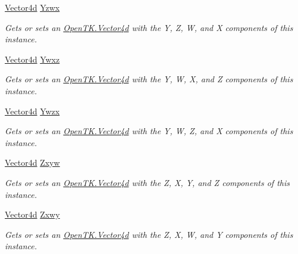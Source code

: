 \begin{DoxyCompactItemize}
\hyperlink{struct_open_t_k_1_1_vector4d}{Vector4d} \hyperlink{struct_open_t_k_1_1_vector4d_a89b53c3e716f7ff0897fd5b7d7e0d424}{Yzwx}
\begin{DoxyCompactList}\small\item\em Gets or sets an \hyperlink{struct_open_t_k_1_1_vector4d}{Open\-T\-K.\-Vector4d} with the Y, Z, W, and X components of this instance. \end{DoxyCompactList}\item 
\hyperlink{struct_open_t_k_1_1_vector4d}{Vector4d} \hyperlink{struct_open_t_k_1_1_vector4d_af6740e2c7d8371dc35017cbdd02cda33}{Ywxz}
\begin{DoxyCompactList}\small\item\em Gets or sets an \hyperlink{struct_open_t_k_1_1_vector4d}{Open\-T\-K.\-Vector4d} with the Y, W, X, and Z components of this instance. \end{DoxyCompactList}\item 
\hyperlink{struct_open_t_k_1_1_vector4d}{Vector4d} \hyperlink{struct_open_t_k_1_1_vector4d_a5af0e53a635f02c740144194401b55e8}{Ywzx}
\begin{DoxyCompactList}\small\item\em Gets or sets an \hyperlink{struct_open_t_k_1_1_vector4d}{Open\-T\-K.\-Vector4d} with the Y, W, Z, and X components of this instance. \end{DoxyCompactList}\item 
\hyperlink{struct_open_t_k_1_1_vector4d}{Vector4d} \hyperlink{struct_open_t_k_1_1_vector4d_a2380266e1d9836e3a31f5e04a33f78f5}{Zxyw}
\begin{DoxyCompactList}\small\item\em Gets or sets an \hyperlink{struct_open_t_k_1_1_vector4d}{Open\-T\-K.\-Vector4d} with the Z, X, Y, and Z components of this instance. \end{DoxyCompactList}\item 
\hyperlink{struct_open_t_k_1_1_vector4d}{Vector4d} \hyperlink{struct_open_t_k_1_1_vector4d_a3ffdae4b4eeea27e94597d6293f704a4}{Zxwy}
\begin{DoxyCompactList}\small\item\em Gets or sets an \hyperlink{struct_open_t_k_1_1_vector4d}{Open\-T\-K.\-Vector4d} with the Z, X, W, and Y components of this instance. \end{DoxyCompactList}\item 

\end{DoxyCompactItemize}
